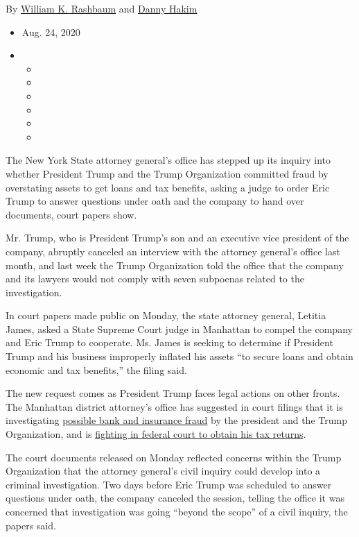 By
\href{https://www.nytimes3xbfgragh.onion/by/william-k-rashbaum}{William
K. Rashbaum} and
\href{https://www.nytimes3xbfgragh.onion/by/danny-hakim}{Danny Hakim}

\begin{itemize}
\item
  Aug. 24, 2020
\item
  \begin{itemize}
  \item
  \item
  \item
  \item
  \item
  \item
  \end{itemize}
\end{itemize}

The New York State attorney general's office has stepped up its inquiry
into whether President Trump and the Trump Organization committed fraud
by overstating assets to get loans and tax benefits, asking a judge to
order Eric Trump to answer questions under oath and the company to hand
over documents, court papers show.

Mr. Trump, who is President Trump's son and an executive vice president
of the company, abruptly canceled an interview with the attorney
general's office last month, and last week the Trump Organization told
the office that the company and its lawyers would not comply with seven
subpoenas related to the investigation.

In court papers made public on Monday, the state attorney general,
Letitia James, asked a State Supreme Court judge in Manhattan to compel
the company and Eric Trump to cooperate. Ms. James is seeking to
determine if President Trump and his business improperly inflated his
assets ``to secure loans and obtain economic and tax benefits,'' the
filing said.

The new request comes as President Trump faces legal actions on other
fronts. The Manhattan district attorney's office has suggested in court
filings that it is investigating
\href{https://www.nytimes3xbfgragh.onion/2020/08/03/nyregion/donald-trump-taxes-cyrus-vance.html}{possible
bank and insurance fraud} by the president and the Trump Organization,
and is
\href{https://www.nytimes3xbfgragh.onion/2020/08/20/nyregion/donald-trump-taxes-cyrus-vance.html?searchResultPosition=2}{fighting
in federal court to obtain his tax returns}.

The court documents released on Monday reflected concerns within the
Trump Organization that the attorney general's civil inquiry could
develop into a criminal investigation. Two days before Eric Trump was
scheduled to answer questions under oath, the company canceled the
session, telling the office it was concerned that investigation was
going ``beyond the scope'' of a civil inquiry, the papers said.

